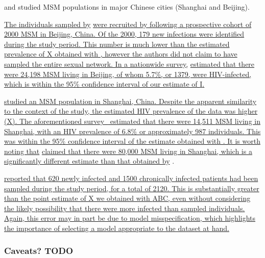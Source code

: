 {{\textcite{wang2015targeting} and \textcite{li2015hiv} studied \gls{MSM}
populations in major Chinese cities (Shanghai and Beijing). 

\uline{The individuals sampled by} \textcite{wang2015targeting} \uline{were
recruited by following a prospective cohort of 2000 \gls{MSM} in Beijing,
China. Of the 2000, 179 new infections were identified during the study period.
This number is much lower than the estimated prevalence of X obtained with
, however the authors did not claim to have sampled the entire
sexual network. In a nationwide survey,} \textcite{wu2013hiv} \uline{estimated
that there were 24,198 \gls{MSM} living in Beijing, of whom 5.7\%, or 1379,
were \gls{HIV}-infected, which is within the 95\% confidence interval of our
estimate of \gls{I}.}

\textcite{li2015hiv} \uline{studied an \gls{MSM} population in Shanghai, China.
Despite the apparent similarity to the context of the
}\textcite{wang2015targeting} \uline{study, the estimated \gls{HIV} prevalence
of the } \citeauthor{li2015hiv} \uline{data was higher (X). The aforementioned
survey~\autocite{wu2013hiv} estimated that there were 14,511 \gls{MSM} living
in Shanghai, with an \gls{HIV} prevalence of 6.8\% or approximately 987
individuals. This was within the 95\% confidence interval of the estimate
obtained with . It is worth noting that} \citeauthor{li2015hiv}
\uline{claimed that there were 80,000 \gls{MSM} living in Shanghai, which is a
significantly different estimate than that obtained by} \textcite{wu2013hiv}.

\textcite{cuevas2009hiv} \uline{reported that 620 newly infected and 1500
chronically infected patients had been sampled during the study period, for a
total of 2120. This is substantially greater than the point estimate of X we
obtained with \gls{ABC}, even without considering the likely possibility that
there were more infected than sampled individuals. Again, this error may in
part be due to model misspecification, which highlights the importance of
selecting a model appropriate to the dataset at hand.}}

\subsubsection{Caveats? TODO}

}

